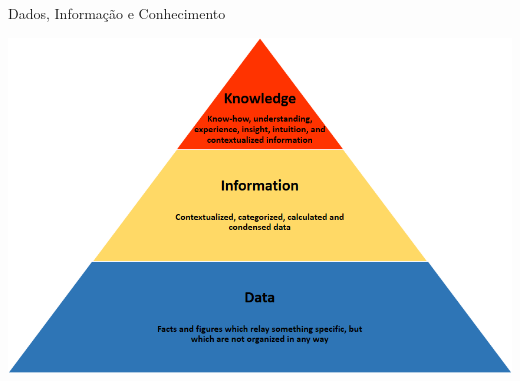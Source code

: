 \documentclass{beamer}
\begin{document}
\begin{frame}{Dados, Informação e Conhecimento}
  \begin{center}
    \includegraphics[height=0.9\textheight]{Intro/Knowledge_pyramid}
  \end{center}
\end{frame}



\end{document}
